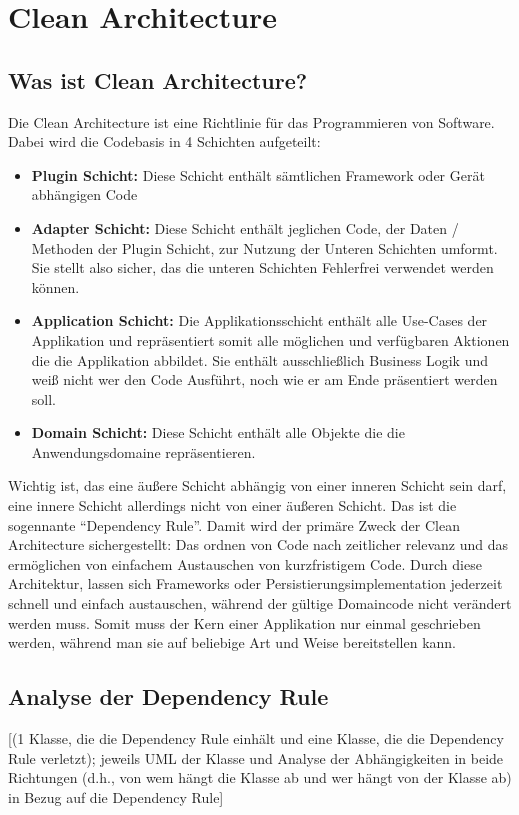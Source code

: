 \chapter{Clean Architecture}

\section{Was ist Clean Architecture?}
Die Clean Architecture ist eine Richtlinie für das Programmieren von Software. Dabei wird die Codebasis in 4 Schichten aufgeteilt:
\begin{itemize}
	\item \textbf{Plugin Schicht:} Diese Schicht enthält sämtlichen Framework oder Gerät abhängigen Code
	\item \textbf{Adapter Schicht:} Diese Schicht enthält jeglichen Code, der Daten / Methoden der Plugin Schicht, zur Nutzung der Unteren Schichten umformt. Sie stellt also sicher, das die unteren Schichten Fehlerfrei verwendet werden können.
	\item \textbf{Application Schicht:} Die Applikationsschicht enthält alle Use-Cases der Applikation und repräsentiert somit alle möglichen und verfügbaren Aktionen die die Applikation abbildet. Sie enthält ausschließlich Business Logik und weiß nicht wer den Code Ausführt, noch wie er am Ende präsentiert werden soll.
	\item \textbf{Domain Schicht:} Diese Schicht enthält alle Objekte die die Anwendungsdomaine repräsentieren.
\end{itemize}
Wichtig ist, das eine äußere Schicht abhängig von einer inneren Schicht sein darf, eine innere Schicht allerdings nicht von einer äußeren Schicht. Das ist die sogennante \enquote{Dependency Rule}. Damit wird der primäre Zweck der Clean Architecture sichergestellt: Das ordnen von Code nach zeitlicher relevanz und das ermöglichen von einfachem Austauschen von kurzfristigem Code. Durch diese Architektur, lassen sich Frameworks oder Persistierungsimplementation jederzeit schnell und einfach austauschen, während der gültige Domaincode nicht verändert werden muss. Somit muss der Kern einer Applikation nur einmal geschrieben werden, während man sie auf beliebige Art und Weise bereitstellen kann.

\section{Analyse der Dependency Rule}
[(1 Klasse, die die Dependency Rule einhält und eine Klasse, die die Dependency Rule verletzt);   jeweils UML der Klasse und Analyse der Abhängigkeiten in beide Richtungen (d.h., von wem hängt die Klasse ab und wer hängt von der Klasse ab) in Bezug auf die Dependency Rule]

